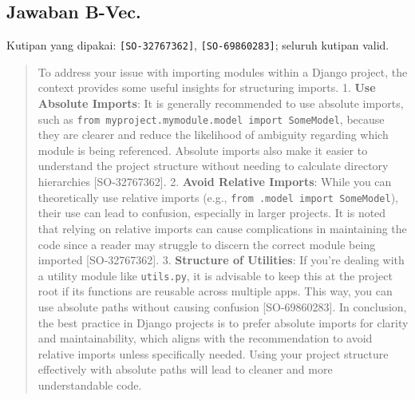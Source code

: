 \subsection{Jawaban B-Vec.} Kutipan yang dipakai: \texttt{[SO-32767362]}, \texttt{[SO-69860283]}; seluruh kutipan valid.
\begin{quote}\small To address your issue with importing modules within a Django project, the context provides some useful insights for structuring imports.  1. \textbf{Use Absolute Imports}: It is generally recommended to use absolute imports, such as \texttt{from myproject.\allowbreak{}mymodule.\allowbreak{}model import SomeModel}, because they are clearer and reduce the likelihood of ambiguity regarding which module is being referenced. Absolute imports also make it easier to understand the project structure without needing to calculate directory hierarchies [SO-32767362].  2. \textbf{Avoid Relative Imports}: While you can theoretically use relative imports (e.g., \texttt{from .\allowbreak{}model import SomeModel}), their use can lead to confusion, especially in larger projects. It is noted that relying on relative imports can cause complications in maintaining the code since a reader may struggle to discern the correct module being imported [SO-32767362].  3. \textbf{Structure of Utilities}: If you're dealing with a utility module like \texttt{utils.\allowbreak{}py}, it is advisable to keep this at the project root if its functions are reusable across multiple apps. This way, you can use absolute paths without causing confusion [SO-69860283].  In conclusion, the best practice in Django projects is to prefer absolute imports for clarity and maintainability, which aligns with the recommendation to avoid relative imports unless specifically needed. Using your project structure effectively with absolute paths will lead to cleaner and more understandable code.\end{quote}
